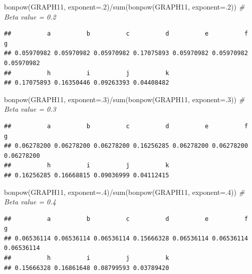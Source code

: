\documentclass[
  notitlepage,
  onecolumn,
  openany]{book}
\newenvironment{Shaded}{\begin{snugshade}}{\end{snugshade}}
\newcommand{\AttributeTok}[1]{\textcolor[rgb]{0.77,0.63,0.00}{#1}}
\newcommand{\CommentTok}[1]{\textcolor[rgb]{0.56,0.35,0.01}{\textit{#1}}}
\newcommand{\DecValTok}[1]{\textcolor[rgb]{0.00,0.00,0.81}{#1}}
\newcommand{\FunctionTok}[1]{\textcolor[rgb]{0.00,0.00,0.00}{#1}}
\newcommand{\NormalTok}[1]{#1}
\newcommand{\SpecialCharTok}[1]{\textcolor[rgb]{0.00,0.00,0.00}{#1}}
\begin{document}
\begin{Shaded}
\begin{Highlighting}[]
\FunctionTok{bonpow}\NormalTok{(GRAPH11, }\AttributeTok{exponent=}\NormalTok{.}\DecValTok{2}\NormalTok{)}\SpecialCharTok{/}\FunctionTok{sum}\NormalTok{(}\FunctionTok{bonpow}\NormalTok{(GRAPH11, }\AttributeTok{exponent=}\NormalTok{.}\DecValTok{2}\NormalTok{)) }\CommentTok{\# Beta value = 0.2}
\end{Highlighting}
\end{Shaded}

\begin{verbatim}
##          a          b          c          d          e          f          g 
## 0.05970982 0.05970982 0.05970982 0.17075893 0.05970982 0.05970982 0.05970982 
##          h          i          j          k 
## 0.17075893 0.16350446 0.09263393 0.04408482
\end{verbatim}

\begin{Shaded}
\begin{Highlighting}[]
\FunctionTok{bonpow}\NormalTok{(GRAPH11, }\AttributeTok{exponent=}\NormalTok{.}\DecValTok{3}\NormalTok{)}\SpecialCharTok{/}\FunctionTok{sum}\NormalTok{(}\FunctionTok{bonpow}\NormalTok{(GRAPH11, }\AttributeTok{exponent=}\NormalTok{.}\DecValTok{3}\NormalTok{)) }\CommentTok{\# Beta value = 0.3}
\end{Highlighting}
\end{Shaded}

\begin{verbatim}
##          a          b          c          d          e          f          g 
## 0.06278200 0.06278200 0.06278200 0.16256285 0.06278200 0.06278200 0.06278200 
##          h          i          j          k 
## 0.16256285 0.16668815 0.09036999 0.04112415
\end{verbatim}

\begin{Shaded}
\begin{Highlighting}[]
\FunctionTok{bonpow}\NormalTok{(GRAPH11, }\AttributeTok{exponent=}\NormalTok{.}\DecValTok{4}\NormalTok{)}\SpecialCharTok{/}\FunctionTok{sum}\NormalTok{(}\FunctionTok{bonpow}\NormalTok{(GRAPH11, }\AttributeTok{exponent=}\NormalTok{.}\DecValTok{4}\NormalTok{)) }\CommentTok{\# Beta value = 0.4}
\end{Highlighting}
\end{Shaded}

\begin{verbatim}
##          a          b          c          d          e          f          g 
## 0.06536114 0.06536114 0.06536114 0.15666328 0.06536114 0.06536114 0.06536114 
##          h          i          j          k 
## 0.15666328 0.16861648 0.08799593 0.03789420
\end{verbatim}
\end{document}
